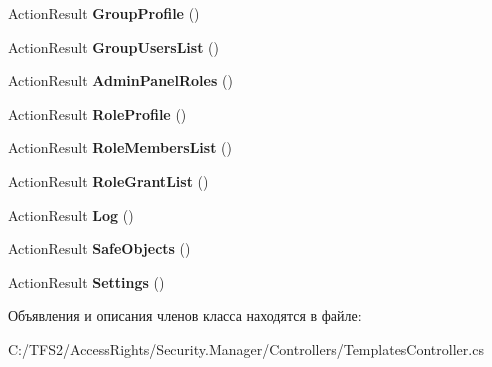 \begin{DoxyCompactItemize}
Action\+Result {\bfseries Group\+Profile} ()
\item 
\mbox{\label{class_security_1_1_manager_1_1_controllers_1_1_templates_controller_a00a8d95636671942aff7096296f910a4}} 
Action\+Result {\bfseries Group\+Users\+List} ()
\item 
\mbox{\label{class_security_1_1_manager_1_1_controllers_1_1_templates_controller_ab619b8bbe8e42fc8c5284b6d171f1d73}} 
Action\+Result {\bfseries Admin\+Panel\+Roles} ()
\item 
\mbox{\label{class_security_1_1_manager_1_1_controllers_1_1_templates_controller_a5358707aea852b76e234f2da9aa659c3}} 
Action\+Result {\bfseries Role\+Profile} ()
\item 
\mbox{\label{class_security_1_1_manager_1_1_controllers_1_1_templates_controller_a095a27b0ab71d34a6d0ef1f3b464cae9}} 
Action\+Result {\bfseries Role\+Members\+List} ()
\item 
\mbox{\label{class_security_1_1_manager_1_1_controllers_1_1_templates_controller_a385c50cce22d0fc477348cb32471d6d4}} 
Action\+Result {\bfseries Role\+Grant\+List} ()
\item 
\mbox{\label{class_security_1_1_manager_1_1_controllers_1_1_templates_controller_a2c9b4a3e99f570beecdbfe9d4cfd6bb4}} 
Action\+Result {\bfseries Log} ()
\item 
\mbox{\label{class_security_1_1_manager_1_1_controllers_1_1_templates_controller_a1d2512fa1a55eb16b368bf7fbdd3e372}} 
Action\+Result {\bfseries Safe\+Objects} ()
\item 
\mbox{\label{class_security_1_1_manager_1_1_controllers_1_1_templates_controller_a7aef3d1a37eb7fbe03f469a485c70cbd}} 
Action\+Result {\bfseries Settings} ()
\end{DoxyCompactItemize}


Объявления и описания членов класса находятся в файле\+:\begin{DoxyCompactItemize}
\item 
C\+:/\+T\+F\+S2/\+Access\+Rights/\+Security.\+Manager/\+Controllers/Templates\+Controller.\+cs\end{DoxyCompactItemize}
